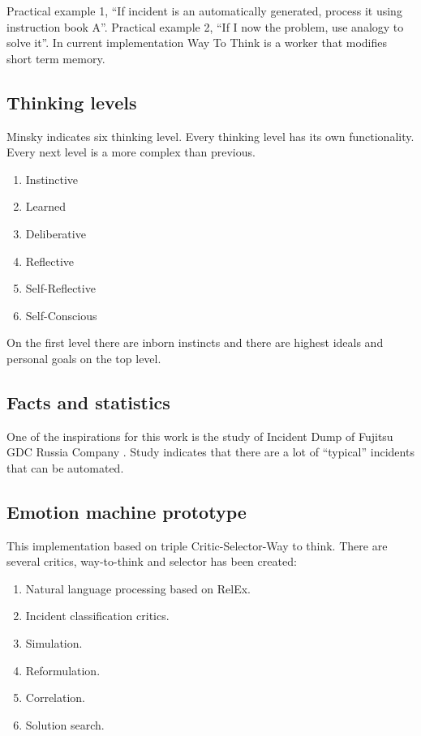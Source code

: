 \documentclass[12pt]{article}
\begin{document}
Practical example 1, “If incident is an automatically generated, process it using instruction book A”.
Practical example 2, “If I now the problem, use analogy to solve it”. In current implementation Way To Think is a worker that modifies short term memory.

\subsection{Thinking levels}

Minsky indicates six thinking level. Every thinking level has its own functionality. Every next level is a more complex than previous.

\begin{enumerate}
 \item Instinctive
 \item Learned
 \item Deliberative
 \item Reflective
 \item Self-Reflective
 \item Self-Conscious
\end{enumerate}
On the first level there are inborn instincts and there are highest ideals and personal goals on the top level.

\subsection{Facts and statistics}
One of the inspirations for this work is the study of Incident Dump of Fujitsu GDC Russia Company . Study indicates that there are a lot of “typical” incidents that can be automated.

\subsection{Emotion machine prototype}
This implementation based on triple Critic-Selector-Way to think. There are several critics, way-to-think and selector has been created:

\begin{enumerate}
 \item Natural language processing based on RelEx.
 \item Incident classification critics.
 \item Simulation.
 \item Reformulation.
 \item Correlation.
 \item Solution search.
\end{enumerate}
\end{document}
